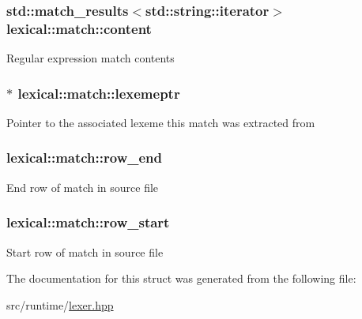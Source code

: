 \subsubsection[{\texorpdfstring{content}{content}}]{\setlength{\rightskip}{0pt plus 5cm}std\+::match\+\_\+results$<$std\+::string\+::iterator$>$ lexical\+::match\+::content}\hypertarget{structlexical_1_1match_a2ebda7888d347b3de302ffc465755f07}{}\label{structlexical_1_1match_a2ebda7888d347b3de302ffc465755f07}
Regular expression match contents 
\subsubsection[{\texorpdfstring{lexemeptr}{lexemeptr}}]{$\ast$ lexical\+::match\+::lexemeptr}\hypertarget{structlexical_1_1match_a346ef13017b47ee41a6abe643e5732e1}{}\label{structlexical_1_1match_a346ef13017b47ee41a6abe643e5732e1}
Pointer to the associated lexeme this match was extracted from 
\subsubsection[{\texorpdfstring{row\+\_\+end}{row_end}}]{ lexical\+::match\+::row\+\_\+end}\hypertarget{structlexical_1_1match_abf7eca2de9cee016df02265a38666486}{}\label{structlexical_1_1match_abf7eca2de9cee016df02265a38666486}
End row of match in source file 
\subsubsection[{\texorpdfstring{row\+\_\+start}{row_start}}]{ lexical\+::match\+::row\+\_\+start}\hypertarget{structlexical_1_1match_a854a8828680bbfc08aa214e875ba5514}{}\label{structlexical_1_1match_a854a8828680bbfc08aa214e875ba5514}
Start row of match in source file 

The documentation for this struct was generated from the following file\+:\begin{DoxyCompactItemize}
\item 
src/runtime/\hyperlink{lexer_8hpp}{lexer.\+hpp}\end{DoxyCompactItemize}
